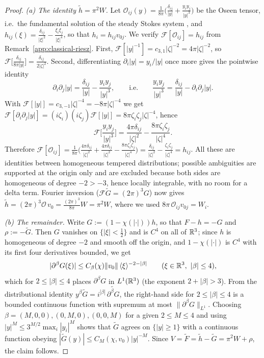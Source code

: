 \begin{proof}
\emph{(a) The identity $\widetilde h=\pi^2W$.} Let
$\mathcal O_{ij}(y)=\frac1{8\pi}\big(\frac{\delta_{ij}}{|y|}
+\frac{y_iy_j}{|y|^3}\big)$ be the Oseen tensor, i.e.\ the fundamental
solution of the steady Stokes system
\cite{LadyzhenskayaBook,Galdi2011}, and
$h_{ij}(\xi)=\frac{\delta_{ij}}{|\xi|^2}-\frac{\xi_i\xi_j}{|\xi|^4}$, so
that $h_i=h_{ij}v_{0j}$. We verify $\mathcal F[\mathcal O_{ij}]=h_{ij}$
from Remark~\ref{app:classical-riesz}. First,
$\mathcal F[|y|^{-1}]=c_{3,1}|\zeta|^{-2}=4\pi|\zeta|^{-2}$, so
$\mathcal F\big[\tfrac{\delta_{ij}}{8\pi|y|}\big]
=\tfrac{\delta_{ij}}{2|\zeta|^{2}}$. Second, differentiating
$\partial_i|y|=y_i/|y|$ once more gives the pointwise identity
\[
\partial_i\partial_j|y|=\frac{\delta_{ij}}{|y|}-\frac{y_iy_j}{|y|^3},
\qquad\text{i.e.}\qquad
\frac{y_iy_j}{|y|^3}=\frac{\delta_{ij}}{|y|}-\partial_i\partial_j|y| .
\]
With $\mathcal F[|y|]=c_{3,-1}|\zeta|^{-4}=-8\pi|\zeta|^{-4}$ we get
$\mathcal F[\partial_i\partial_j|y|]
=(i\zeta_i)(i\zeta_j)\mathcal F[|y|]=8\pi\zeta_i\zeta_j|\zeta|^{-4}$, hence
\[
\mathcal F\Big[\frac{y_iy_j}{|y|^3}\Big]
=\frac{4\pi\delta_{ij}}{|\zeta|^2}-\frac{8\pi\zeta_i\zeta_j}{|\zeta|^4}.
\]
Therefore
$\mathcal F[\mathcal O_{ij}]
=\frac1{8\pi}\big(\frac{4\pi\delta_{ij}}{|\zeta|^2}
+\frac{4\pi\delta_{ij}}{|\zeta|^2}
-\frac{8\pi\zeta_i\zeta_j}{|\zeta|^4}\big)
=\frac{\delta_{ij}}{|\zeta|^2}-\frac{\zeta_i\zeta_j}{|\zeta|^4}=h_{ij}$.
All these are identities between homogeneous tempered distributions;
possible ambiguities are supported at the origin only and are excluded
because both sides are homogeneous of degree $-2>-3$, hence locally
integrable, with no room for a delta term. Fourier inversion
($\mathcal F\widetilde G=(2\pi)^3G$) now gives
$\widetilde h=(2\pi)^3\mathcal O\,v_0=\frac{(2\pi)^3}{8\pi}W=\pi^2W$,
where we used $8\pi\,\mathcal O_{ij}v_{0j}=W_i$.

\emph{(b) The remainder.} Write $G:=(1-\chi(|\cdot|))h$, so that
$F-h=-G$ and $\rho:=-\widetilde G$. Then $G$ vanishes on
$\{|\xi|<\tfrac12\}$ and is $C^4$ on all of $\mathbb R^3$; since $h$ is
homogeneous of degree $-2$ and smooth off the origin, and
$1-\chi(|\cdot|)$ is $C^4$ with its first four derivatives bounded, we
get
\[
|\partial^\beta G(\xi)|\le C_\beta(\chi)\|v_0\|\,\langle\xi\rangle^{-2-|\beta|}
\qquad(\xi\in\mathbb R^3,\ |\beta|\le4),
\]
which for $2\le|\beta|\le4$ places $\partial^\beta G$ in $L^1(\mathbb R^3)$
(the exponent $2+|\beta|>3$). From
the distributional identity
$y^\beta\widetilde G=i^{|\beta|}\,\widetilde{\partial^\beta G}$, the
right-hand side for $2\le|\beta|\le4$ is a bounded continuous function
with supremum at most $\|\partial^\beta G\|_{L^1}$. Choosing
$\beta=(M,0,0),(0,M,0),(0,0,M)$ for a given $2\le M\le4$ and using
$|y|^M\le3^{M/2}\max_i|y_i|^M$ shows that $\widetilde G$ agrees on
$\{|y|\ge1\}$ with a continuous function obeying
$|\widetilde G(y)|\le C_M(\chi,v_0)|y|^{-M}$. Since
$V=\widetilde F=\widetilde h-\widetilde G=\pi^2W+\rho$, the claim
follows.
\end{proof}

